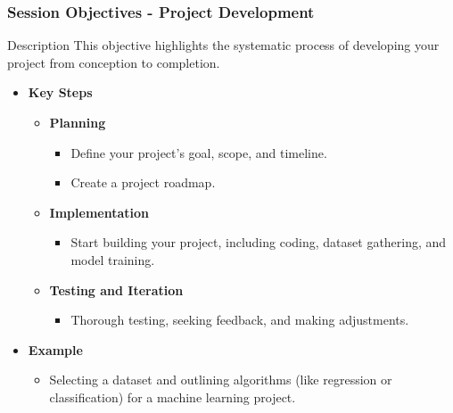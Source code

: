 \documentclass[aspectratio=169]{beamer}
\begin{document}
\begin{frame}[fragile]
    \frametitle{Session Objectives - Project Development}
    \begin{block}{Description}
        This objective highlights the systematic process of developing your project from conception to completion.
    \end{block}
    \begin{itemize}
        \item \textbf{Key Steps}
            \begin{itemize}
                \item \textbf{Planning}
                    \begin{itemize}
                        \item Define your project's goal, scope, and timeline.
                        \item Create a project roadmap.
                    \end{itemize}
                \item \textbf{Implementation}
                    \begin{itemize}
                        \item Start building your project, including coding, dataset gathering, and model training.
                    \end{itemize}
                \item \textbf{Testing and Iteration}
                    \begin{itemize}
                        \item Thorough testing, seeking feedback, and making adjustments.
                    \end{itemize}
            \end{itemize}
        \item \textbf{Example}
            \begin{itemize}
                \item Selecting a dataset and outlining algorithms (like regression or classification) for a machine learning project.
            \end{itemize}
    \end{itemize}
\end{frame}
\end{document}
